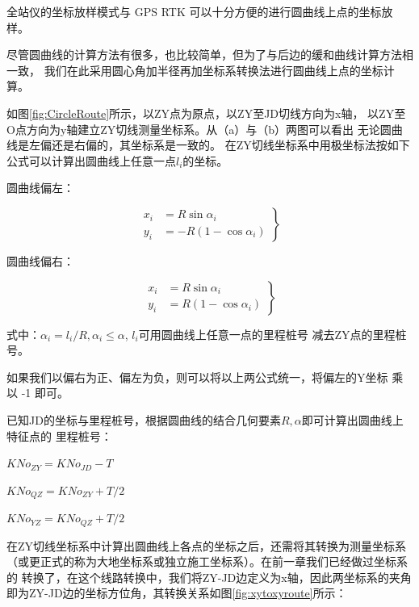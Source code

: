  全站仪的坐标放样模式与 GPS RTK 可以十分方便的进行圆曲线上点的坐标放样。

 尽管圆曲线的计算方法有很多，也比较简单，但为了与后边的缓和曲线计算方法相一致，
 我们在此采用圆心角加半径再加坐标系转换法进行圆曲线上点的坐标计算。

 如图\ref{fig:CircleRoute}所示，以ZY点为原点，以ZY至JD切线方向为x轴，
 以ZY至O点方向为y轴建立ZY切线测量坐标系。从（a）与（b）两图可以看出
无论圆曲线是左偏还是右偏的，其坐标系是一致的。
 在ZY切线坐标系中用极坐标法按如下公式可以计算出圆曲线上任意一点$l_i$的坐标。

圆曲线偏左：

\begin{equation}
\left .
\begin{aligned}
x_{i} &= R \sin \alpha_i   \\
y_{i} &= -R(1- \cos \alpha_i)
\end{aligned}
\right \}
\label{eq:ZYLeftXY}
\end{equation}

圆曲线偏右：

\begin{equation}
\left .
\begin{aligned}
x_{i} &= R \sin \alpha_i   \\
y_{i} &= R(1- \cos \alpha_i)
\end{aligned}
\right \}
\label{eq:ZYRightXY}
\end{equation}

式中：$\alpha_i = l_i / R,  \alpha_i \le \alpha $, $l_i$可用圆曲线上任意一点的里程桩号
减去ZY点的里程桩号。

如果我们以偏右为正、偏左为负，则可以将以上两公式统一，将偏左的Y坐标
乘以 -1 即可。

已知JD的坐标与里程桩号，根据圆曲线的结合几何要素$R, \alpha$即可计算出圆曲线上特征点的
里程桩号：

$KNo_{ZY} = KNo_{JD} - T$

$KNo_{QZ} = KNo_{ZY} + T/2$

$KNo_{YZ} = KNo_{QZ} + T/2$

在ZY切线坐标系中计算出圆曲线上各点的坐标之后，还需将其转换为测量坐标系
（或更正式的称为大地坐标系或独立施工坐标系）。在前一章我们已经做过坐标系的
转换了，在这个线路转换中，我们将ZY-JD边定义为x轴，因此两坐标系的夹角
即为ZY-JD边的坐标方位角，其转换关系如图\ref{fig:xytoxyroute}所示：

